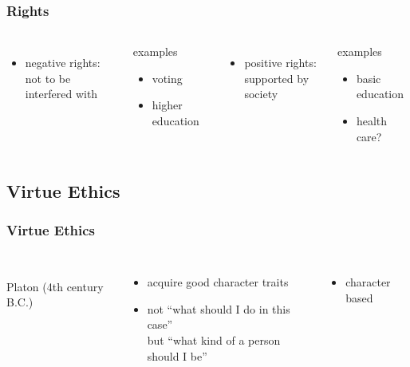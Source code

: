 \documentclass[dvipsnames]{beamer}
\theoremstyle{plain}
\begin{document}
\begin{frame}
  \frametitle{Rights}

  \begin{columns}
    \begin{itemize}
      \item \alert{negative} rights:\\
        not to be interfered with
    \end{itemize}
    \begin{exampleblock}{examples}
      \begin{itemize}
        \item voting
        \item higher education
      \end{itemize}
    \end{exampleblock}

    \pause
    \begin{itemize}
      \item \alert{positive} rights:\\
        supported by society
    \end{itemize}
    \begin{exampleblock}{examples}
      \begin{itemize}
        \item basic education
        \item health care?
      \end{itemize}
    \end{exampleblock}
  \end{columns}
\end{frame}

\subsection{Virtue Ethics}

\begin{frame}
  \frametitle{Virtue Ethics}

  \begin{columns}
    \begin{center}
      \\
      Platon (4th century B.C.)
    \end{center}

    \pause
    \begin{itemize}
      \item acquire good character traits

      \item not ``what should I do in this case''\\
        but ``what kind of a person should I be''
    \end{itemize}

    \begin{itemize}
      \item character based
    \end{itemize}
  \end{columns}
\end{frame}
\end{document}
